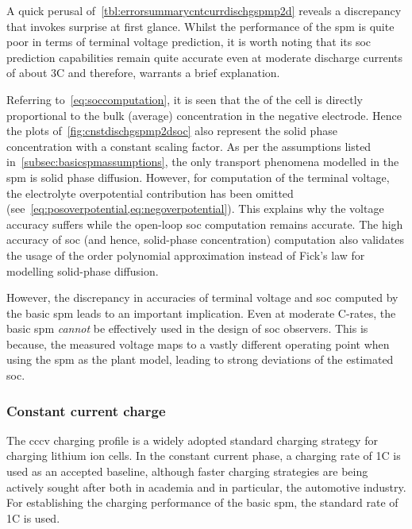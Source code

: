 

A   quick   perusal  of~\cref{tbl:errorsummarycntcurrdischgspmp2d}   reveals   a
discrepancy that invokes surprise at first glance. Whilst the performance of the
\gls{spm} is  quite poor in  terms of terminal  voltage prediction, it  is worth
noting that its \gls{soc} prediction  capabilities remain quite accurate even at
moderate  discharge  currents  of  about  3C and  therefore,  warrants  a  brief
explanation.

Referring to~\cref{eq:soccomputation}, it is  seen that the  of
the cell  is directly proportional  to the  bulk (average) concentration  in the
negative  electrode.  Hence  the  plots  of~\cref{fig:cnstdischgspmp2dsoc}  also
represent the solid  phase concentration with a constant scaling  factor. As per
the assumptions listed  in~\cref{subsec:basicspmassumptions}, the only transport
phenomena  modelled in  the \gls{spm}  is  solid phase  diffusion. However,  for
computation of the terminal  voltage, the electrolyte overpotential contribution
has  been   omitted  (see~\cref{eq:posoverpotential,eq:negoverpotential}).  This
explains  why  the  voltage  accuracy  suffers  while  the  open-loop  \gls{soc}
computation  remains  accurate.  The  high accuracy  of  \gls{soc}  (and  hence,
solid-phase  concentration)   computation  also  validates  the   usage  of  the
  order  polynomial  approximation  instead of  Fick's  law  for
modelling solid-phase diffusion.

However,  the  discrepancy  in  accuracies of  terminal  voltage  and  \gls{soc}
computed  by the  basic \gls{spm}  leads to  an important  implication. Even  at
moderate C-rates, the  basic \gls{spm} \emph{cannot} be effectively  used in the
design of \gls{soc}  observers. This is because, the measured  voltage maps to a
vastly different  operating point when using  the \gls{spm} as the  plant model,
leading to strong deviations of the estimated \gls{soc}.


\subsubsection*{Constant current charge}\label{subsubsec:cnstcurrchgsim}

The \gls{cccv} charging  profile is a widely adopted  standard charging strategy
for charging lithium  ion cells. In the constant current  phase, a charging rate
of 1C is  used as an accepted baseline, although  faster charging strategies are
being actively sought  after both in academia and in  particular, the automotive
industry. For establishing the charging performance of the basic \gls{spm}, the
standard rate of 1C is used.


